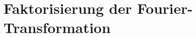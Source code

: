 %
%
%
\section{Faktorisierung der Fourier-Transformation
\label{buch:diskret:section:vandermonde}}








